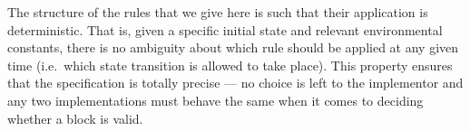 The structure of the rules that we give here is such that their application is
deterministic. That is, given a specific initial state and relevant environmental
constants, there is no ambiguity
about which rule should be applied at any given time (i.e.~which state
transition is allowed to take place). This property ensures that the specification
is totally precise --- no
choice is left to the implementor and any two implementations must
behave the same when it comes to deciding whether a block is valid.
